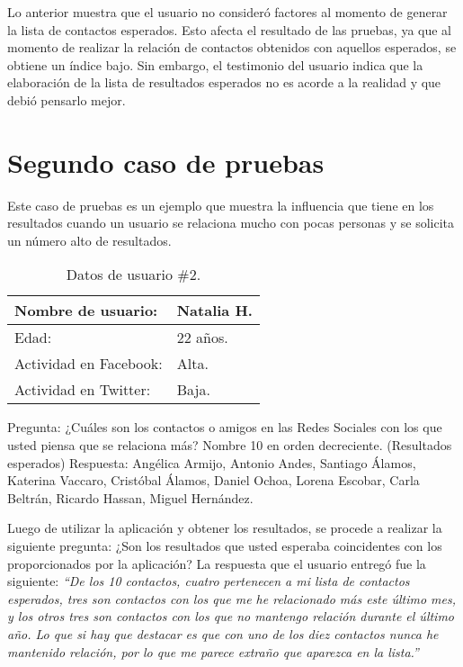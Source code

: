 Lo anterior muestra que el usuario no consideró factores al momento de generar la lista de contactos esperados. Esto afecta el resultado de las pruebas, ya que al momento de realizar la relación de contactos obtenidos con aquellos esperados, se obtiene un índice bajo. Sin embargo, el testimonio del usuario indica que la elaboración de la lista de resultados esperados no es acorde a la realidad y que debió pensarlo mejor.

\section{Segundo caso de pruebas}

Este caso de pruebas es un ejemplo que muestra la influencia que tiene en los resultados cuando un usuario se relaciona mucho con pocas personas y se solicita un número alto de resultados.

\begin{table}[H]
\begin{center}
\caption[Datos de usuario \#2.]{Datos de usuario \#2.}
\label{tab:anexo-tab2}
\begin{tabular}{|l|>{\raggedright}p{4cm}|}
\hline 
Nombre de usuario: & Natalia H.\tabularnewline
\hline 
\hline 
Edad: & 22 años.\tabularnewline
\hline 
Actividad en Facebook: & Alta.\tabularnewline
\hline 
Actividad en Twitter: & Baja.\tabularnewline
\hline 
\end{tabular}
\end{center}
\end{table}

Pregunta: ¿Cuáles son los contactos o amigos en las Redes Sociales con los que usted piensa que se relaciona más? Nombre 10 en orden decreciente. (Resultados esperados)
Respuesta: Angélica Armijo, Antonio Andes, Santiago Álamos, Katerina Vaccaro, Cristóbal Álamos, Daniel Ochoa, Lorena Escobar, Carla Beltrán, Ricardo Hassan, Miguel Hernández.

Luego de utilizar la aplicación y obtener los resultados, se procede a realizar la siguiente pregunta: ¿Son los resultados que usted esperaba coincidentes con los proporcionados por la aplicación? La respuesta que el usuario entregó fue la siguiente: \textit{“De los 10 contactos,  cuatro pertenecen a mi lista de contactos esperados, tres son contactos con los que me he relacionado más este último mes, y los otros tres son contactos con los que no mantengo relación durante el último año. Lo que si hay que destacar es que con uno de los diez contactos nunca he mantenido relación, por lo que me parece extraño que aparezca en la lista.”}

